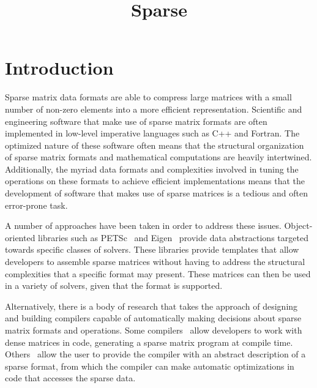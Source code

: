 \documentclass[11pt,conference]{IEEEtran}
\begin{document}
\title{Sparse}
\author{
  \and
}

\maketitle

\section{Introduction}

Sparse matrix data formats are able to compress large matrices with a small number of non-zero elements into a more efficient representation.  
Scientific and engineering software that make use of sparse matrix formats are often implemented in low-level imperative languages such as C++ and Fortran.  The optimized nature of these software often means that the structural organization of sparse matrix formats and mathematical computations are heavily intertwined.  Additionally, the myriad data formats and complexities involved in tuning the operations on these formats to achieve efficient implementations means that the development of software that makes use of sparse matrices is a tedious and often error-prone task.

A number of approaches have been taken in order to address these issues.  Object-oriented libraries such as PETSc~\cite{petsc2019} and Eigen~\cite{eigenweb2010} provide data abstractions targeted towards specific classes of solvers.  These libraries provide templates that allow developers to assemble sparse matrices without having to address the structural complexities that a specific format may present.  These matrices can then be used in a variety of solvers, given that the format is supported.

Alternatively, there is a body of research that takes the approach of designing and building compilers capable of automatically making decisions about sparse matrix formats and operations.  Some compilers~\cite{bik1995, bik1996} allow developers to work with dense matrices in code, generating a sparse matrix program at compile time.  Others~\cite{kotlyar1997} allow the user to provide the compiler with an abstract description of a sparse format, from which the compiler can make automatic optimizations in code that accesses the sparse data.
\end{document}
